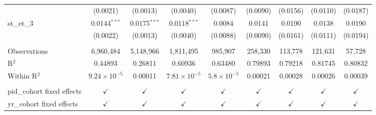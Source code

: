 \begin{tabular}{lcccccccc}
                              & (0.0021)              & (0.0013)       & (0.0040)              & (0.0087)                  & (0.0090)      & (0.0156)                  & (0.0110)      & (0.0187)\\   
   st\_et\_3                  & 0.0144$^{***}$        & 0.0175$^{***}$ & 0.0118$^{***}$        & 0.0084                    & 0.0141        & 0.0190                    & 0.0138        & 0.0190\\   
                              & (0.0022)              & (0.0013)       & (0.0040)              & (0.0088)                  & (0.0090)      & (0.0161)                  & (0.0111)      & (0.0194)\\   
    \\
   Observations               & 6,960,484             & 5,148,966      & 1,811,495             & 985,907                   & 258,330       & 113,778                   & 121,631       & 57,728\\  
   R$^2$                      & 0.44893               & 0.26811        & 0.60936               & 0.63480                   & 0.79893       & 0.79218                   & 0.81745       & 0.80832\\  
   Within R$^2$               & $9.24\times 10^{-5}$  & 0.00011        & $7.81\times 10^{-5}$  & $5.8\times 10^{-5}$       & 0.00021       & 0.00028                   & 0.00026       & 0.00039\\  
    \\
   pid\_cohort fixed effects  & $\checkmark$          & $\checkmark$   & $\checkmark$          & $\checkmark$              & $\checkmark$  & $\checkmark$              & $\checkmark$  & $\checkmark$\\   
   yr\_cohort fixed effects   & $\checkmark$          & $\checkmark$   & $\checkmark$          & $\checkmark$              & $\checkmark$  & $\checkmark$              & $\checkmark$  & $\checkmark$\\   
   \bottomrule
\end{tabular}
\par\endgroup


